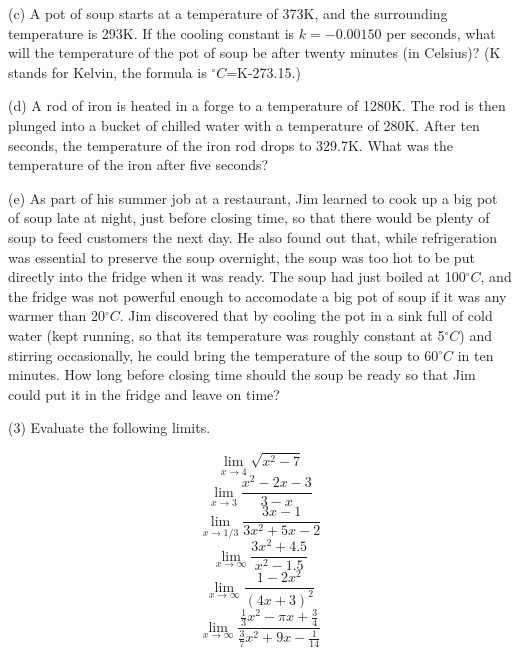 \documentclass[11pt]{article}
\begin{document}
(c) A pot of soup starts at a temperature of 373K, and the
surrounding temperature is 293K. If the cooling constant is
$k=-0.00150$ per seconds, what will the temperature of the pot of soup
be after twenty minutes (in Celsius)? (K stands for Kelvin, the formula
is $^{\circ}C$=K-273.15.)

(d) A rod of iron is heated in a forge to a temperature of 1280K.
The rod is then plunged into a bucket of chilled water with a
temperature of 280K. After ten seconds, the temperature of the iron
rod drops to 329.7K. What was the temperature of the iron after five
seconds?

(e) As part of his summer job at a restaurant, Jim learned to cook up
a big pot of soup late at night, just before closing time, so that
there would be plenty of soup to feed customers the next day. He also
found out that, while refrigeration was essential to preserve the soup
overnight, the soup was too hot to be put directly into the fridge
when it was ready. The soup had just boiled at 100$^{\circ}C$, and the
fridge was not powerful enough to accomodate a big pot of soup if it
was any warmer than 20$^{\circ}C$. Jim discovered that by cooling the
pot in a sink full of cold water (kept running, so that its
temperature was roughly constant at 5$^{\circ}C$) and stirring
occasionally, he could bring the temperature of the soup to
60$^{\circ}C$ in ten minutes. How long before closing time should the
soup be ready so that Jim could put it in the fridge and leave on
time?

(3) Evaluate the following limits.

\begin{equation}
  \label{eq:pheighou}
\lim_{x\rightarrow{}4}\sqrt{x^{2}-7}
\end{equation}
\begin{equation}
  \label{eq:yoozeice}
\lim_{x\rightarrow{}3}\frac{x^{2}-2x-3}{3-x}
\end{equation}
\begin{equation}
  \label{eq:eiteuyoe}
\lim_{x\rightarrow{}1/3}\frac{3x-1}{3x^{2}+5x-2}
\end{equation}
\begin{equation}
  \label{eq:igeeraos}
\lim_{x\rightarrow\infty}\frac{3x^{2}+4.5}{x^{2}-1.5}
\end{equation}
\begin{equation}
  \label{eq:laideico}
\lim_{x\rightarrow\infty}\frac{1-2x^{2}}{(4x+3)^{2}}
\end{equation}
\begin{equation}
  \label{eq:ikoebuba}
\lim_{x\rightarrow\infty}\frac{\frac{1}{3}x^{2}-\pi{}x+\frac{3}{4}}{\frac{3}{7}x^{2}+9x-\frac{1}{14}}
\end{equation}
\end{document}
